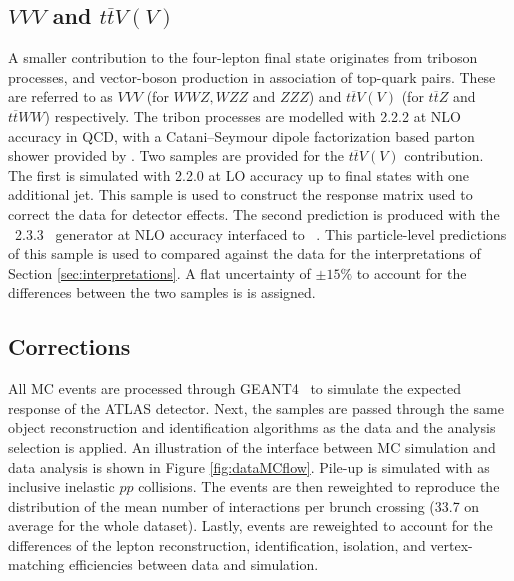 \subsection{$VVV$ and $t\overline{t}V(V)$}
A smaller contribution to the four-lepton final state originates from triboson processes, and vector-boson production in association of top-quark pairs. These are referred to as $VVV$ (for $WWZ, WZZ$ and $ZZZ$) and $t\overline{t}V(V)$ (for $t\overline{t}Z$ and $t\overline{t}WW$) respectively. The tribon processes are modelled with \SHERPA{} 2.2.2 at NLO accuracy in QCD, with a Catani–Seymour dipole factorization based parton shower provided by \SHERPA{}. Two samples are provided for the  $t\overline{t}V(V)$ contribution. The first is simulated with \SHERPA{} 2.2.0 at LO accuracy up to final states with one additional jet. This sample is used to construct the response matrix used to correct the data for detector effects. The second prediction is produced with the \madgraph~2.3.3~\cite{Alwall:2014hca} generator at NLO accuracy interfaced to ~\cite{Sjostrand:2014zea}. This particle-level predictions of this sample is used to compared against the data for the interpretations of Section \ref{sec:interpretations}. A flat uncertainty of $\pm15\%$ to account for the differences between the two samples is is assigned.

\subsection{Corrections}
All MC events are processed through GEANT4~\cite{Geant4} to simulate the expected response of the ATLAS detector. Next, the samples are passed through the same object reconstruction and identification algorithms as the data and the analysis selection is applied. An illustration of the interface between MC simulation and data analysis is shown in Figure \ref{fig:dataMCflow}. Pile-up is simulated with  as inclusive inelastic $pp$ collisions. The events are then reweighted to reproduce the distribution of the mean number of interactions per brunch crossing (33.7 on average for the whole dataset). Lastly, events are  reweighted to account for the differences of the lepton reconstruction, identification, isolation, and vertex-matching efficiencies between data and simulation.